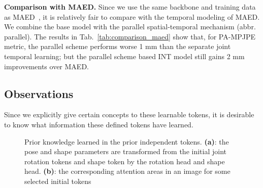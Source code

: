 {\bf Comparison with MAED.} Since we use the same backbone and training data as MAED~\citep{maed:wan2021encoder}, it is relatively fair to compare with the temporal modeling of MAED. We combine the base model with the parallel spatial-temporal mechanism (abbr. parallel). The results in Tab.~\ref{tab:comparison_maed} show that, for PA-MPJPE metric, the parallel scheme performs worse 1 mm than the separate joint temporal learning; but the parallel scheme based INT model still gains 2 mm improvements over MAED.






\subsection{Observations}


Since we explicitly give certain concepts to these learnable tokens, it is desirable to know what information these defined tokens have learned. %


\begin{figure}
	\caption{Prior knowledge learned in the prior independent tokens. \textbf{(a)}: the pose and shape parameters are transformed from the initial joint rotation tokens and shape token by the rotation head and shape head. \textbf{(b)}: the corresponding attention areas in an image for some selected initial tokens} \vspace{-0.2in}
\end{figure}



